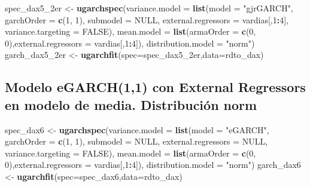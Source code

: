 \documentclass[
  11pt,
]{article}
\newenvironment{Shaded}{\begin{snugshade}}{\end{snugshade}}
\newcommand{\DataTypeTok}[1]{\textcolor[rgb]{0.13,0.29,0.53}{#1}}
\newcommand{\DecValTok}[1]{\textcolor[rgb]{0.00,0.00,0.81}{#1}}
\newcommand{\KeywordTok}[1]{\textcolor[rgb]{0.13,0.29,0.53}{\textbf{#1}}}
\newcommand{\NormalTok}[1]{#1}
\newcommand{\OperatorTok}[1]{\textcolor[rgb]{0.81,0.36,0.00}{\textbf{#1}}}
\newcommand{\OtherTok}[1]{\textcolor[rgb]{0.56,0.35,0.01}{#1}}
\newcommand{\StringTok}[1]{\textcolor[rgb]{0.31,0.60,0.02}{#1}}
\begin{document}
\begin{Shaded}
\begin{Highlighting}[]
\NormalTok{spec_dax5_2er <-}\StringTok{ }\KeywordTok{ugarchspec}\NormalTok{(}\DataTypeTok{variance.model =} \KeywordTok{list}\NormalTok{(}\DataTypeTok{model =} \StringTok{"gjrGARCH"}\NormalTok{, }\DataTypeTok{garchOrder =} \KeywordTok{c}\NormalTok{(}\DecValTok{1}\NormalTok{, }\DecValTok{1}\NormalTok{), }
                    \DataTypeTok{submodel =} \OtherTok{NULL}\NormalTok{, }\DataTypeTok{external.regressors =}\NormalTok{ vardias[,}\DecValTok{1}\OperatorTok{:}\DecValTok{4}\NormalTok{], }\DataTypeTok{variance.targeting =} \OtherTok{FALSE}\NormalTok{), }
                    \DataTypeTok{mean.model =} \KeywordTok{list}\NormalTok{(}\DataTypeTok{armaOrder =} \KeywordTok{c}\NormalTok{(}\DecValTok{0}\NormalTok{, }\DecValTok{0}\NormalTok{),}\DataTypeTok{external.regressors =}\NormalTok{ vardias[,}\DecValTok{1}\OperatorTok{:}\DecValTok{4}\NormalTok{]),}
               \DataTypeTok{distribution.model =} \StringTok{"norm"}\NormalTok{)}
\NormalTok{garch_dax5_2er <-}\StringTok{ }\KeywordTok{ugarchfit}\NormalTok{(}\DataTypeTok{spec=}\NormalTok{spec_dax5_2er,}\DataTypeTok{data=}\NormalTok{rdto_dax)}
\end{Highlighting}
\end{Shaded}

\hypertarget{modelo-egarch11-con-external-regressors-en-modelo-de-media.-distribuciuxf3n-norm}{%
\subsection{Modelo eGARCH(1,1) con External Regressors en modelo de
media. Distribución
norm}\label{modelo-egarch11-con-external-regressors-en-modelo-de-media.-distribuciuxf3n-norm}}

\begin{Shaded}
\begin{Highlighting}[]
\NormalTok{spec_dax6 <-}\StringTok{ }\KeywordTok{ugarchspec}\NormalTok{(}\DataTypeTok{variance.model =} \KeywordTok{list}\NormalTok{(}\DataTypeTok{model =} \StringTok{"eGARCH"}\NormalTok{, }\DataTypeTok{garchOrder =} \KeywordTok{c}\NormalTok{(}\DecValTok{1}\NormalTok{, }\DecValTok{1}\NormalTok{), }
                    \DataTypeTok{submodel =} \OtherTok{NULL}\NormalTok{, }\DataTypeTok{external.regressors =} \OtherTok{NULL}\NormalTok{, }\DataTypeTok{variance.targeting =} \OtherTok{FALSE}\NormalTok{), }
                    \DataTypeTok{mean.model =} \KeywordTok{list}\NormalTok{(}\DataTypeTok{armaOrder =} \KeywordTok{c}\NormalTok{(}\DecValTok{0}\NormalTok{, }\DecValTok{0}\NormalTok{),}\DataTypeTok{external.regressors =}\NormalTok{ vardias[,}\DecValTok{1}\OperatorTok{:}\DecValTok{4}\NormalTok{]),}
               \DataTypeTok{distribution.model =} \StringTok{"norm"}\NormalTok{)}
\NormalTok{garch_dax6 <-}\StringTok{ }\KeywordTok{ugarchfit}\NormalTok{(}\DataTypeTok{spec=}\NormalTok{spec_dax6,}\DataTypeTok{data=}\NormalTok{rdto_dax)}
\end{Highlighting}
\end{Shaded}
\end{document}
